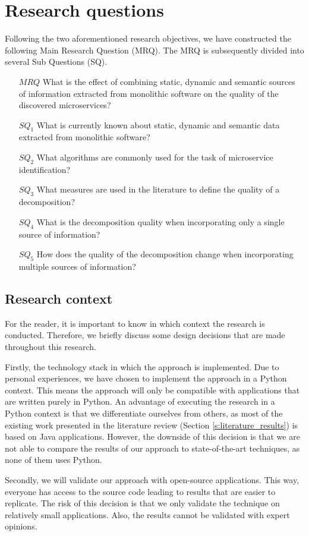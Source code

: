 \section{Research questions}
Following the two aforementioned research objectives, we have constructed the following Main Research Question (MRQ). The MRQ is subsequently divided into several Sub Questions (SQ).

\begin{itemize}
    \item[$MRQ$] What is the effect of combining static, dynamic and semantic sources of information extracted from monolithic software on the quality of the discovered microservices?
\end{itemize}
\begin{itemize}
    \item[$SQ_1$] What is currently known about static, dynamic and semantic data extracted from monolithic software?
    \item[$SQ_2$] What algorithms are commonly used for the task of microservice identification?
    \item[$SQ_3$] What measures are used in the literature to define the quality of a decomposition?
    \item[$SQ_4$] What is the decomposition quality when incorporating only a single source of information? 
    \item[$SQ_5$] How does the quality of the decomposition change when incorporating multiple sources of information?
\end{itemize}

\subsection{Research context}
For the reader, it is important to know in which context the research is conducted. Therefore, we briefly discuss some design decisions that are made throughout this research.\par
Firstly, the technology stack in which the approach is implemented. Due to personal experiences, we have chosen to implement the approach in a Python context. This means the approach will only be compatible with applications that are written purely in Python. An advantage of executing the research in a Python context is that we differentiate ourselves from others, as most of the existing work presented in the literature review (Section \ref{s:literature_results}) is based on Java applications. However, the downside of this decision is that we are not able to compare the results of our approach to state-of-the-art techniques, as none of them uses Python. \par
Secondly, we will validate our approach with open-source applications. This way, everyone has access to the source code leading to results that are easier to replicate. The risk of this decision is that we only validate the technique on relatively small applications. Also, the results cannot be validated with expert opinions. 